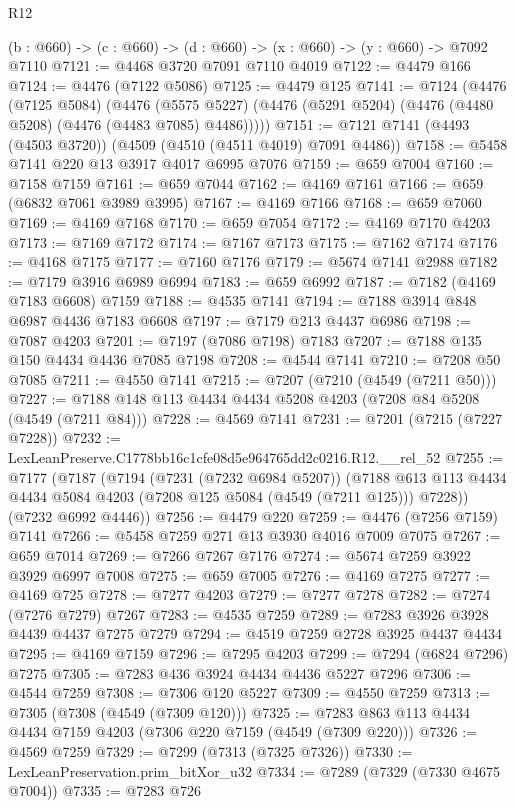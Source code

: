 \begin{lexlean}{R12}
\begin{coremodule}
  (b : @660) -> (c : @660) -> (d : @660) -> (x : @660) -> (y : @660) -> @7092 @7110
@7121 := @4468 @3720 @7091 @7110 @4019
@7122 := @4479 @166
@7124 := @4476 (@7122 @5086)
@7125 := @4479 @125
@7141 := @7124
    (@4476
      (@7125 @5084)
      (@4476 (@5575 @5227) (@4476 (@5291 @5204) (@4476 (@4480 @5208) (@4476 (@4483 @7085) @4486)))))
@7151 := @7121 @7141 (@4493 (@4503 @3720)) (@4509 (@4510 (@4511 @4019) @7091 @4486))
@7158 := @5458 @7141 @220 @13 @3917 @4017 @6995 @7076
@7159 := @659 @7004
@7160 := @7158 @7159
@7161 := @659 @7044
@7162 := @4169 @7161
@7166 := @659 (@6832 @7061 @3989 @3995)
@7167 := @4169 @7166
@7168 := @659 @7060
@7169 := @4169 @7168
@7170 := @659 @7054
@7172 := @4169 @7170 @4203
@7173 := @7169 @7172
@7174 := @7167 @7173
@7175 := @7162 @7174
@7176 := @4168 @7175
@7177 := @7160 @7176
@7179 := @5674 @7141 @2988
@7182 := @7179 @3916 @6989 @6994
@7183 := @659 @6992
@7187 := @7182 (@4169 @7183 @6608) @7159
@7188 := @4535 @7141
@7194 := @7188 @3914 @848 @6987 @4436 @7183 @6608
@7197 := @7179 @213 @4437 @6986
@7198 := @7087 @4203
@7201 := @7197 (@7086 @7198) @7183
@7207 := @7188 @135 @150 @4434 @4436 @7085 @7198
@7208 := @4544 @7141
@7210 := @7208 @50 @7085
@7211 := @4550 @7141
@7215 := @7207 (@7210 (@4549 (@7211 @50)))
@7227 := @7188 @148 @113 @4434 @4434 @5208 @4203 (@7208 @84 @5208 (@4549 (@7211 @84)))
@7228 := @4569 @7141
@7231 := @7201 (@7215 (@7227 @7228))
@7232 := LexLeanPreserve.C1778bb16c1cfe08d5e964765dd2c0216.R12.__rel_52
@7255 := @7177
    (@7187
      (@7194
        (@7231 (@7232 @6984 @5207))
        (@7188 @613 @113 @4434 @4434 @5084 @4203 (@7208 @125 @5084 (@4549 (@7211 @125))) @7228))
      (@7232 @6992 @4446))
@7256 := @4479 @220
@7259 := @4476 (@7256 @7159) @7141
@7266 := @5458 @7259 @271 @13 @3930 @4016 @7009 @7075
@7267 := @659 @7014
@7269 := @7266 @7267 @7176
@7274 := @5674 @7259 @3922 @3929 @6997 @7008
@7275 := @659 @7005
@7276 := @4169 @7275
@7277 := @4169 @725
@7278 := @7277 @4203
@7279 := @7277 @7278
@7282 := @7274 (@7276 @7279) @7267
@7283 := @4535 @7259
@7289 := @7283 @3926 @3928 @4439 @4437 @7275 @7279
@7294 := @4519 @7259 @2728 @3925 @4437 @4434
@7295 := @4169 @7159
@7296 := @7295 @4203
@7299 := @7294 (@6824 @7296) @7275
@7305 := @7283 @436 @3924 @4434 @4436 @5227 @7296
@7306 := @4544 @7259
@7308 := @7306 @120 @5227
@7309 := @4550 @7259
@7313 := @7305 (@7308 (@4549 (@7309 @120)))
@7325 := @7283 @863 @113 @4434 @4434 @7159 @4203 (@7306 @220 @7159 (@4549 (@7309 @220)))
@7326 := @4569 @7259
@7329 := @7299 (@7313 (@7325 @7326))
@7330 := LexLeanPreservation.prim_bitXor_u32
@7334 := @7289 (@7329 (@7330 @4675 @7004))
@7335 := @7283 @726

\end{coremodule}
\end{lexlean}

